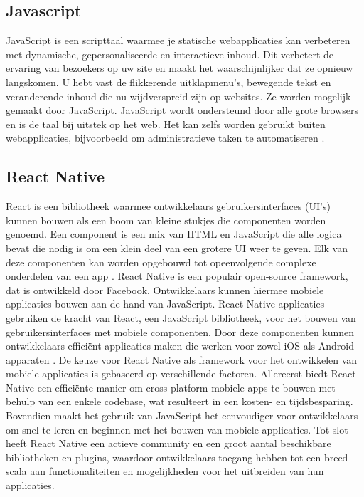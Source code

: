 \subsection{Javascript}
\label{sec:javascript}


JavaScript is een scripttaal waarmee je statische webapplicaties kan verbeteren met dynamische, gepersonaliseerde en interactieve inhoud. Dit verbetert de ervaring van bezoekers op uw site en maakt het waarschijnlijker dat ze opnieuw langskomen. U hebt vast de flikkerende uitklapmenu's, bewegende tekst en veranderende inhoud die nu wijdverspreid zijn op websites. Ze worden mogelijk gemaakt door JavaScript. JavaScript wordt ondersteund door alle grote browsers en is de taal bij uitstek op het web. Het kan zelfs worden gebruikt buiten webapplicaties, bijvoorbeeld om administratieve taken te automatiseren \autocite{Wilton2004}.

\subsection{React Native}
\label{sec:react native}

React is een bibliotheek waarmee ontwikkelaars gebruikersinterfaces (UI's) kunnen bouwen als een boom van kleine stukjes die componenten worden genoemd. Een component is een mix van HTML en JavaScript die alle logica bevat die nodig is om een klein deel van een grotere UI weer te geven. Elk van deze componenten kan worden opgebouwd tot opeenvolgende complexe onderdelen van een app \autocite{Baer2018}. React Native is een populair open-source framework, dat is ontwikkeld door Facebook. Ontwikkelaars kunnen hiermee mobiele applicaties bouwen aan de hand van JavaScript. React Native applicaties gebruiken de kracht van React, een JavaScript bibliotheek, voor het bouwen van gebruikersinterfaces met mobiele componenten. Door deze componenten kunnen ontwikkelaars efficiënt applicaties maken die werken voor zowel iOS als Android apparaten \autocite{Vinnik2021}. De keuze voor React Native als framework voor het ontwikkelen van mobiele applicaties is gebaseerd op verschillende factoren. Allereerst biedt React Native een efficiënte manier om cross-platform mobiele apps te bouwen met behulp van een enkele codebase, wat resulteert in een kosten- en tijdsbesparing. Bovendien maakt het gebruik van JavaScript het eenvoudiger voor ontwikkelaars om snel te leren en beginnen met het bouwen van mobiele applicaties. Tot slot heeft React Native een actieve community en een groot aantal beschikbare bibliotheken en plugins, waardoor ontwikkelaars toegang hebben tot een breed scala aan functionaliteiten en mogelijkheden voor het uitbreiden van hun applicaties.

